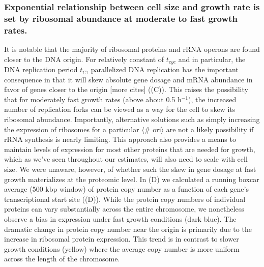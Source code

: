 \subsubsection{Exponential relationship between cell size and growth rate is
set by ribosomal abundance at moderate to fast growth rates.}

It is notable that the majority of ribosomal proteins and rRNA operons are found
closer to the DNA origin. For relatively constant of $t_{cyc}$ and in
particular, the DNA replication  period $t_C$, parallelized DNA replication has
the important consequence in that it will skew absolute gene dosage and mRNA
abundance in favor of genes closer to the origin \citep{scholz2019} [more cites]
((C)). This raises the possibility that for
moderately fast growth rates (above about 0.5 h$^{-1}$), the increased number of
replication forks can be viewed as a way for the cell to skew its ribosomal
abundance. Importantly, alternative solutions such as simply increasing the
expression of ribosomes for a particular $\langle$\# ori$\rangle$ are not a
likely possibility if rRNA synthesis is nearly limiting. This approach also
provides a means to maintain levels of expression for most other proteins that
are needed  for growth, which as we've seen throughout our estimates, will also
need to scale with cell size. We were unaware, however, of whether such the skew
in  gene dosage at fast growth materializes at the proteomic level. In
(D) we calculated a running boxcar average (500 kbp
window) of protein copy number as a function of each gene's transcriptional
start site ((D)). While the protein copy numbers of
individual proteins can vary substantially across the entire chromosome, we
nonetheless observe a bias in expression under fast growth conditions (dark
blue). The dramatic change in protein copy number near the origin is primarily
due to the increase in ribosomal protein expression. This trend is in contrast
to slower growth conditions (yellow) where the average copy number is more
uniform across the length of the chromosome.

